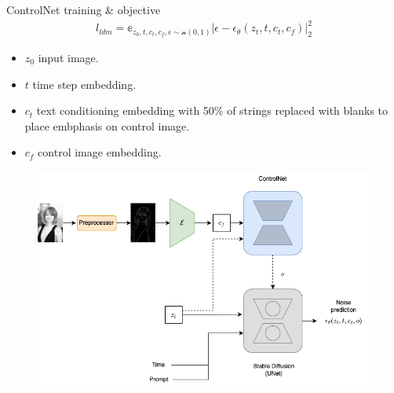 \documentclass[8pt]{beamer}
\begin{document}
\begin{frame}{ControlNet training \& objective}
    \fontsize{7pt}{7pt}\selectfont
            \begin{align*}
                l_{ldm} = \mathbb{e}_{z_0, t, c_t, c_f, \epsilon \sim \mathcal{n}(0,1)} \lvert \epsilon - \epsilon_{\theta}(z_t, t, c_t, c_f) \rvert_2^2
            \end{align*}
            \begin{itemize}
                \item $z_0$ input image.
                \item $t$ time step embedding.
                \item $c_t$ text conditioning embedding with 50\% of strings replaced with blanks to place embphasis on control image.
                \item $c_f$ control image embedding.
            \end{itemize}
            \begin{figure}
                \includegraphics[scale=0.23]{images/cn_training}
                \label{fig:control_net_training}
            \end{figure}
\end{frame}
\end{document}
